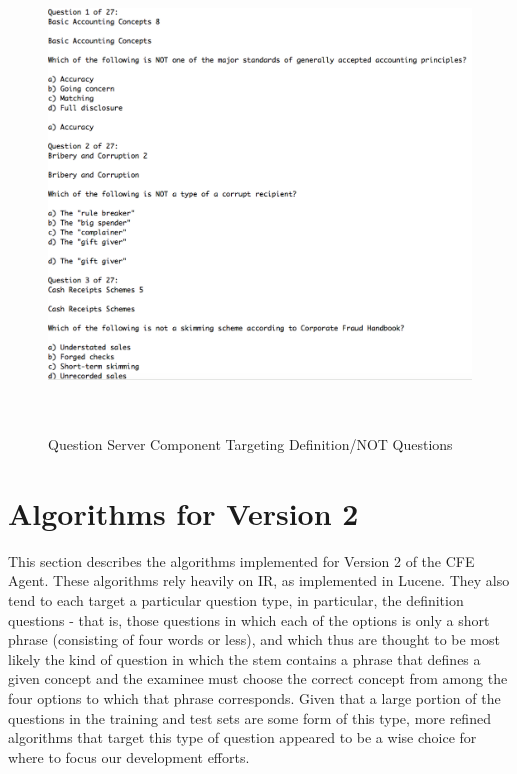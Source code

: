 \begin{figure}
\centering
\vspace{1.0in}
\includegraphics[width=125mm, height=125mm]{question_server.png}
\caption{Question Server Component Targeting Definition/NOT Questions}
\label{fig:question_server}
\end{figure}


\section{Algorithms for Version 2}

This section describes the algorithms implemented for Version 2 of the CFE Agent.  These algorithms rely heavily on IR, as implemented in Lucene.  They also tend to each target a particular question type, in particular, the definition questions - that is, those questions in which each of the options is only a short phrase (consisting of four words or less), and which thus are thought to be most likely the kind of question in which the stem contains a phrase that defines a given concept and the examinee must choose the correct concept from among the four options to which that phrase corresponds.  Given that a large portion of the questions in the training and test sets are some form of this type, more refined algorithms that target this type of question appeared to be a wise choice for where to focus our development efforts.

